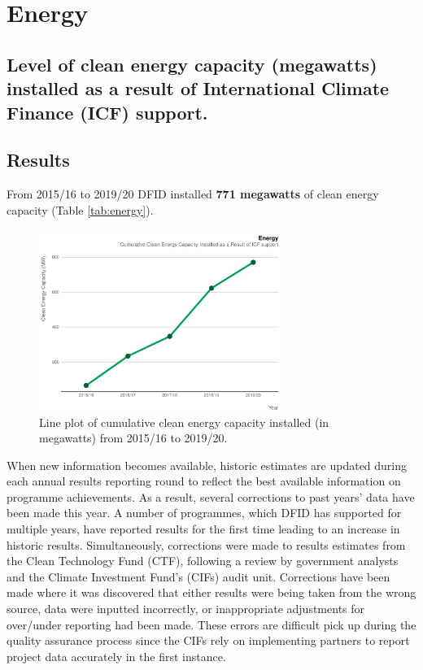 \chapter{Energy}

\section*{Level of clean energy capacity (megawatts) installed as a result of International Climate Finance (ICF) support.}

\thispagestyle{empty}


\section{Results}

From 2015/16 to 2019/20 DFID installed \textbf{771 megawatts} of clean energy capacity (Table \ref{tab:energy}). %

\begin{figure}[htbp]
	\centering
	\includegraphics[width=0.7\textwidth]{../figs/energy_cumulative_plot} \hfill
	\caption{Line plot of cumulative clean energy capacity installed (in megawatts) from 2015/16 to 2019/20.}
	\label{fig:energy_cumulative_plot}
\end{figure}

When new information becomes available, historic estimates are updated during each annual results reporting round to reflect the best available information on programme achievements. %
As a result, several corrections to past years' data have been made this year. %
A number of programmes, which DFID has supported for multiple years, have reported results for the first time leading to an increase in historic results. %
Simultaneously, corrections were made to results estimates from the Clean Technology Fund (CTF), following a review by government analysts and the Climate Investment Fund’s (CIFs) audit unit.  %
Corrections have been made where it was discovered that either results were being taken from the wrong source, data were inputted incorrectly, or inappropriate adjustments for over/under reporting had been made. %
These errors are difficult pick up during the quality assurance process since the CIFs rely on implementing partners to report project data accurately in the first instance. %

